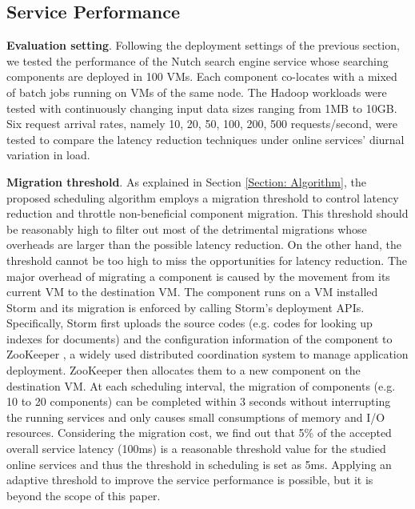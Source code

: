 \documentclass[10pt, conference, compsocconf]{IEEEtran}
\begin{document}
\subsection{Service Performance} \label{Section: Service Performance}
\textbf{Evaluation setting}. Following the deployment settings of the previous section, we tested the performance of the Nutch search engine service whose searching components are deployed in 100 VMs. Each component co-locates with a mixed of batch jobs running on VMs of the same node. The Hadoop workloads were tested with continuously changing input data sizes ranging from 1MB to 10GB. Six request arrival rates, namely 10, 20, 50, 100, 200, 500 requests/second, were tested to compare the latency reduction techniques under online services' diurnal variation in load.



\textbf{Migration threshold}. As explained in Section \ref{Section: Algorithm}, the proposed scheduling algorithm employs a migration threshold to control latency reduction and throttle non-beneficial component migration. This threshold should be reasonably high to filter out most of the detrimental migrations whose overheads are larger than the possible latency reduction. On the other hand, the threshold cannot be too high to miss the opportunities for latency reduction.
The major overhead of migrating a component is caused by the movement from its current VM to the destination VM. The component runs on a VM installed Storm and its migration is enforced by calling Storm's deployment APIs. Specifically, Storm first uploads the source codes (e.g. codes for looking up indexes for documents) and the configuration information of the component to ZooKeeper \cite{ZooKeeperWebsite}, a widely used distributed coordination system to manage application deployment. ZooKeeper then allocates them to a new component on the destination VM. At each scheduling interval, the migration of components (e.g. 10 to 20 components) can be completed within 3 seconds without interrupting the running services and only causes small consumptions of memory and I/O resources.
Considering the migration cost, we find out that 5\% of the accepted overall service latency (100ms) is a reasonable threshold value for the studied online services and thus the threshold in scheduling is set as 5ms. Applying an adaptive threshold to improve the service performance is possible, but it is beyond the scope of this paper.
\end{document}

